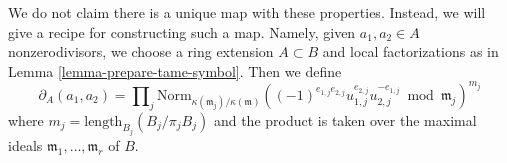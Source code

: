 \medskip\noindent
We do not claim there is a unique map with these properties.
Instead, we will give a recipe for constructing such a map.
Namely, given $a_1, a_2 \in A$ nonzerodivisors, we choose
a ring extension $A \subset B$ and local factorizations
as in Lemma \ref{lemma-prepare-tame-symbol}.
Then we define
\begin{equation}
\label{equation-tame-symbol}
\partial_A(a_1, a_2) = \prod\nolimits_j
\text{Norm}_{\kappa(\mathfrak m_j)/\kappa(\mathfrak m)}
((-1)^{e_{1, j}e_{2, j}}u_{1, j}^{e_{2, j}}u_{2, j}^{-e_{1, j}}
\bmod \mathfrak m_j)^{m_j}
\end{equation}
where $m_j = \text{length}_{B_j}(B_j/\pi_j B_j)$ and the product
is taken over the maximal ideals $\mathfrak m_1, \ldots, \mathfrak m_r$ of $B$.

